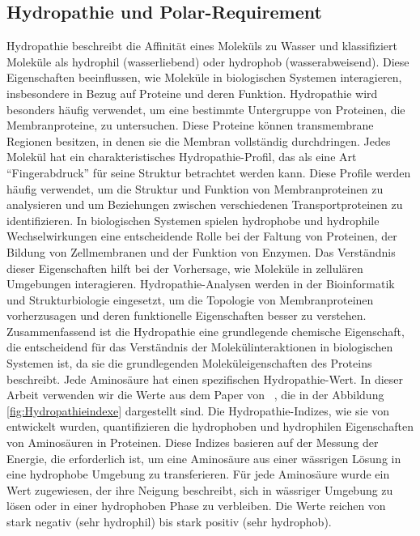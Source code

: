 \documentclass[german,version-2022-01]{uzl-thesis}
\begin{document}
\subsection{Hydropathie und Polar-Requirement}
Hydropathie beschreibt die Affinit\"at eines Molek\"uls zu Wasser und klassifiziert Molek\"ule als hydrophil (wasserliebend) oder hydrophob (wasserabweisend). Diese Eigenschaften beeinflussen, wie Molek\"ule in biologischen Systemen interagieren, insbesondere in Bezug auf Proteine und deren Funktion. Hydropathie wird besonders h\"aufig verwendet, um eine bestimmte Untergruppe von Proteinen, die Membranproteine, zu untersuchen. Diese Proteine k\"onnen transmembrane Regionen besitzen, in denen sie die Membran vollst\"andig durchdringen. Jedes Molek\"ul hat ein charakteristisches Hydropathie-Profil, das als eine Art "`Fingerabdruck"' f\"ur seine Struktur betrachtet werden kann. Diese Profile werden h\"aufig verwendet, um die Struktur und Funktion von Membranproteinen zu analysieren und um Beziehungen zwischen verschiedenen Transportproteinen zu identifizieren. In biologischen Systemen spielen hydrophobe und hydrophile Wechselwirkungen eine entscheidende Rolle bei der Faltung von Proteinen, der Bildung von Zellmembranen und der Funktion von Enzymen. Das Verst\"andnis dieser Eigenschaften hilft bei der Vorhersage, wie Molek\"ule in zellul\"aren Umgebungen interagieren. Hydropathie-Analysen werden in der Bioinformatik und Strukturbiologie eingesetzt, um die Topologie von Membranproteinen vorherzusagen und deren funktionelle Eigenschaften besser zu verstehen. Zusammenfassend ist die Hydropathie eine grundlegende chemische Eigenschaft, die entscheidend f\"ur das Verst\"andnis der Molek\"ulinteraktionen in biologischen Systemen ist, da sie die grundlegenden Molek\"uleigenschaften des Proteins beschreibt. Jede Aminos\"aure hat einen spezifischen Hydropathie-Wert. In dieser Arbeit verwenden wir die Werte aus dem Paper  von \citeauthor{kyte_simple_1982}~\cite{kyte_simple_1982}, die in der Abbildung \ref{fig:Hydropathieindexe} dargestellt sind. Die Hydropathie-Indizes, wie sie von \citeauthor{kyte_simple_1982} entwickelt wurden, quantifizieren die hydrophoben und hydrophilen Eigenschaften von Aminos\"auren in Proteinen. Diese Indizes basieren auf der Messung der Energie, die erforderlich ist, um eine Aminos\"aure aus einer w\"assrigen L\"osung in eine hydrophobe Umgebung zu transferieren. F\"ur jede Aminos\"aure wurde ein Wert zugewiesen, der ihre Neigung beschreibt, sich in w\"assriger Umgebung zu l\"osen oder in einer hydrophoben Phase zu verbleiben. Die Werte reichen von stark negativ (sehr hydrophil) bis stark positiv (sehr hydrophob).
\end{document}
